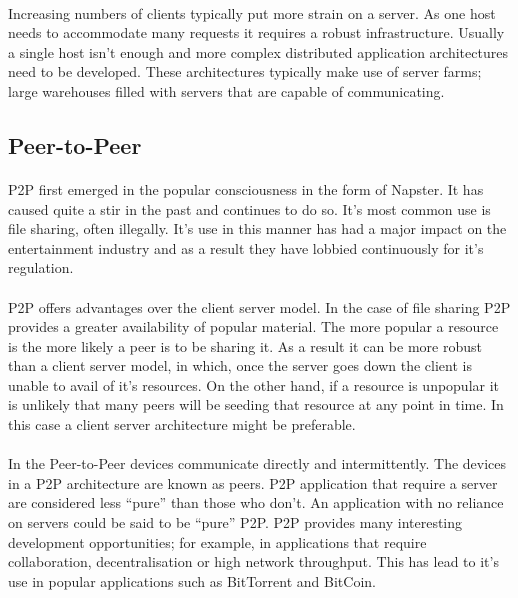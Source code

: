 \documentclass[11pt]{amsart}
\begin{document}
\paragraph{}
Increasing numbers of clients typically put more strain on a server. As one host needs to accommodate many requests it requires a robust infrastructure. Usually a single host isn't enough and more complex distributed application architectures need to be developed. These architectures typically make use of server farms; large warehouses filled with servers that are capable of communicating.

\subsection{Peer-to-Peer}
\paragraph{}
P2P first emerged in the popular consciousness in the form of Napster. It has caused quite a stir in the past and continues to do so. It's most common use is file sharing, often illegally. It's use in this manner has had a major impact on the entertainment industry and as a result they have lobbied continuously for it's regulation.
\paragraph{}
 P2P offers advantages over the client server model. In the case of file sharing P2P provides a greater availability of popular material. The more popular a resource is the more likely a peer is to be sharing it. As a result it can be more robust than a client server model, in which, once the server goes down the client is unable to avail of it's resources. On the other hand, if a resource is unpopular it is unlikely that many peers will be seeding that resource at any point in time. In this case a client server architecture might be preferable.
\paragraph{}
In the Peer-to-Peer devices communicate directly and intermittently. The devices in a P2P architecture are known as peers. P2P application that require a server are considered less ``pure'' than those who don't. An application with no reliance on servers could be said to be ``pure'' P2P. P2P provides many interesting development opportunities; for example, in applications that require collaboration, decentralisation or high network throughput. This has lead to it's use in popular applications such as BitTorrent and BitCoin.
\end{document}

